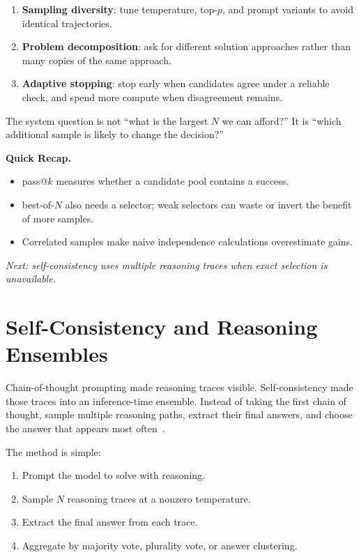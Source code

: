 \begin{enumerate}[nosep]
  \item \textbf{Sampling diversity}: tune temperature, top-$p$, and prompt variants to avoid identical trajectories.
  \item \textbf{Problem decomposition}: ask for different solution approaches rather than many copies of the same approach.
  \item \textbf{Adaptive stopping}: stop early when candidates agree under a reliable check, and spend more compute when disagreement remains.
\end{enumerate}

The system question is not ``what is the largest $N$ we can afford?'' It is ``which additional sample is likely to change the decision?''

\begin{quickrecap}
\textbf{Quick Recap.}
\begin{itemize}[nosep,leftmargin=1.5em]
  \item pass@$k$ measures whether a candidate pool contains a success.
  \item best-of-$N$ also needs a selector; weak selectors can waste or invert the benefit of more samples.
  \item Correlated samples make naive independence calculations overestimate gains.
\end{itemize}
\textit{Next: self-consistency uses multiple reasoning traces when exact selection is unavailable.}
\end{quickrecap}


\section{Self-Consistency and Reasoning Ensembles}
\label{sec:ch18-self-consistency}

Chain-of-thought prompting made reasoning traces visible. Self-consistency made those traces into an inference-time ensemble. Instead of taking the first chain of thought, sample multiple reasoning paths, extract their final answers, and choose the answer that appears most often~\cite{wang2022selfconsistency}.

The method is simple:

\begin{enumerate}[nosep]
  \item Prompt the model to solve with reasoning.
  \item Sample $N$ reasoning traces at a nonzero temperature.
  \item Extract the final answer from each trace.
  \item Aggregate by majority vote, plurality vote, or answer clustering.
\end{enumerate}

